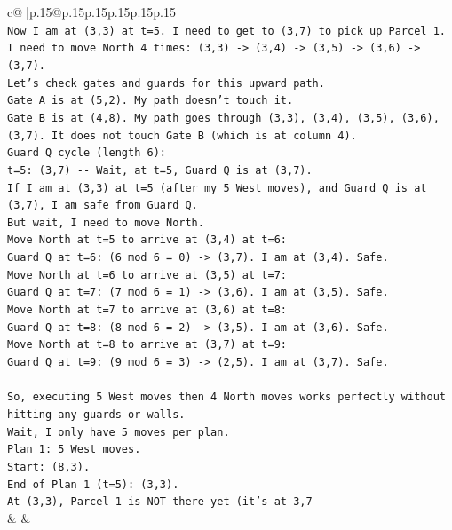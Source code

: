 \documentclass{article}
\begin{document}
{\begin{supertabular}{c@{$\;$}|p{.15\linewidth}@{}p{.15\linewidth}p{.15\linewidth}p{.15\linewidth}p{.15\linewidth}p{.15\linewidth}}
{{{\\ 
\texttt{Now I am at (3,3) at t=5. I need to get to (3,7) to pick up Parcel 1.} \\
\texttt{I need to move North 4 times: (3,3) {-}> (3,4) {-}> (3,5) {-}> (3,6) {-}> (3,7).} \\
\texttt{Let's check gates and guards for this upward path.} \\
\texttt{Gate A is at (5,2). My path doesn't touch it.} \\
\texttt{Gate B is at (4,8). My path goes through (3,3), (3,4), (3,5), (3,6), (3,7). It does not touch Gate B (which is at column 4).} \\
\texttt{Guard Q cycle (length 6):} \\
\texttt{t=5: (3,7) {-}{-} Wait, at t=5, Guard Q is at (3,7).} \\
\texttt{If I am at (3,3) at t=5 (after my 5 West moves), and Guard Q is at (3,7), I am safe from Guard Q.} \\
\texttt{But wait, I need to move North.} \\
\texttt{Move North at t=5 to arrive at (3,4) at t=6:} \\
\texttt{Guard Q at t=6: (6 mod 6 = 0) {-}> (3,7). I am at (3,4). Safe.} \\
\texttt{Move North at t=6 to arrive at (3,5) at t=7:} \\
\texttt{Guard Q at t=7: (7 mod 6 = 1) {-}> (3,6). I am at (3,5). Safe.} \\
\texttt{Move North at t=7 to arrive at (3,6) at t=8:} \\
\texttt{Guard Q at t=8: (8 mod 6 = 2) {-}> (3,5). I am at (3,6). Safe.} \\
\texttt{Move North at t=8 to arrive at (3,7) at t=9:} \\
\texttt{Guard Q at t=9: (9 mod 6 = 3) {-}> (2,5). I am at (3,7). Safe.} \\
\\ 
\texttt{So, executing 5 West moves then 4 North moves works perfectly without hitting any guards or walls.} \\
\texttt{Wait, I only have 5 moves per plan.} \\
\texttt{Plan 1: 5 West moves.} \\
\texttt{Start: (8,3).} \\
\texttt{End of Plan 1 (t=5): (3,3).} \\
\texttt{At (3,3), Parcel 1 is NOT there yet (it's at 3,7} \\
            }
        }
    }
    & & \\ \\


\end{supertabular}}
\end{document}
